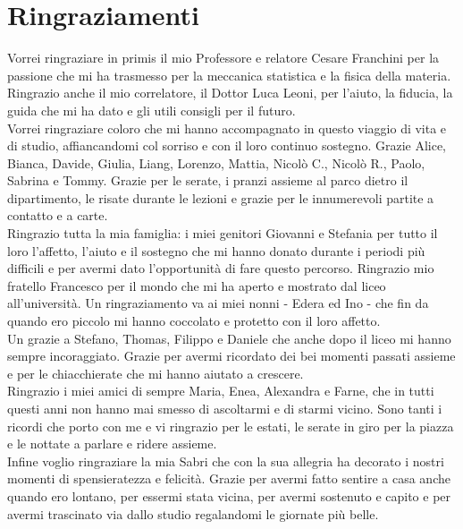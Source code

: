 \chapter*{Ringraziamenti}

Vorrei ringraziare in primis il mio Professore e relatore Cesare Franchini per la passione che mi ha trasmesso per la meccanica statistica e la fisica della materia. Ringrazio anche il mio correlatore, il Dottor Luca Leoni, per l'aiuto, la fiducia, la guida che mi ha dato e gli utili consigli per il futuro.
\vspace{4mm}
\\
Vorrei ringraziare coloro che mi hanno accompagnato in questo viaggio di vita e di studio, affiancandomi col sorriso e con il loro continuo sostegno. Grazie Alice, Bianca, Davide, Giulia, Liang, Lorenzo, Mattia, Nicolò C., Nicolò R., Paolo, Sabrina e Tommy. Grazie per le serate, i pranzi assieme al parco dietro il dipartimento, le risate durante le lezioni e grazie per le innumerevoli partite a contatto e a carte.
\vspace{4mm}
\\
Ringrazio tutta la mia famiglia: i miei genitori Giovanni e Stefania per tutto il loro l'affetto, l'aiuto e il sostegno che mi hanno donato durante i periodi più difficili e per avermi dato l'opportunità di fare questo percorso. Ringrazio mio fratello Francesco per il mondo che mi ha aperto e mostrato dal liceo all'università. Un ringraziamento va ai miei nonni - Edera ed Ino - che fin da quando ero piccolo mi hanno coccolato e protetto con il loro affetto.
\vspace{4mm}
\\
Un grazie a Stefano, Thomas, Filippo e Daniele che anche dopo il liceo mi hanno sempre incoraggiato. Grazie per avermi ricordato dei bei momenti passati assieme e per le chiacchierate che mi hanno aiutato a crescere.
\vspace{4mm}
\\
Ringrazio i miei amici di sempre Maria, Enea, Alexandra e Farne, che in tutti questi anni non hanno mai smesso di ascoltarmi e di starmi vicino. Sono tanti i ricordi che porto con me e vi ringrazio per le estati, le serate in giro per la piazza e le nottate a parlare e ridere assieme.
\vspace{4mm}
\\
Infine voglio ringraziare la mia Sabri che con la sua allegria ha decorato i nostri momenti di spensieratezza e felicità.
Grazie per avermi fatto sentire a casa anche quando ero lontano, per essermi stata vicina, per avermi sostenuto e capito e per avermi trascinato via dallo studio regalandomi le giornate più belle.